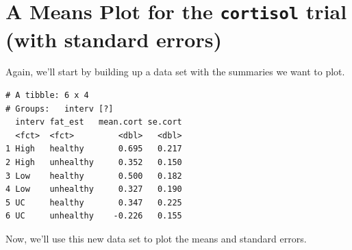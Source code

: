 \documentclass[]{book}
\newenvironment{Shaded}{\begin{snugshade}}{\end{snugshade}}
\newcommand{\KeywordTok}[1]{\textcolor[rgb]{0.13,0.29,0.53}{\textbf{#1}}}
\newcommand{\DataTypeTok}[1]{\textcolor[rgb]{0.13,0.29,0.53}{#1}}
\newcommand{\StringTok}[1]{\textcolor[rgb]{0.31,0.60,0.02}{#1}}
\newcommand{\OperatorTok}[1]{\textcolor[rgb]{0.81,0.36,0.00}{\textbf{#1}}}
\newcommand{\NormalTok}[1]{#1}
\theoremstyle{definition}
\theoremstyle{definition}
\theoremstyle{definition}
\theoremstyle{remark}
\begin{document}
\section{\texorpdfstring{A Means Plot for the \texttt{cortisol} trial
(with standard
errors)}{A Means Plot for the cortisol trial (with standard errors)}}\label{a-means-plot-for-the-cortisol-trial-with-standard-errors}

Again, we'll start by building up a data set with the summaries we want
to plot.

\begin{Shaded}
\end{Shaded}

\begin{verbatim}
# A tibble: 6 x 4
# Groups:   interv [?]
  interv fat_est   mean.cort se.cort
  <fct>  <fct>         <dbl>   <dbl>
1 High   healthy       0.695   0.217
2 High   unhealthy     0.352   0.150
3 Low    healthy       0.500   0.182
4 Low    unhealthy     0.327   0.190
5 UC     healthy       0.347   0.225
6 UC     unhealthy    -0.226   0.155
\end{verbatim}

Now, we'll use this new data set to plot the means and standard errors.
\end{document}
